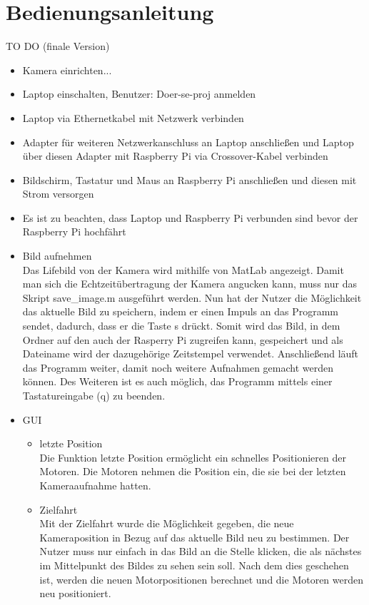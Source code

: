 \documentclass[12pt,a4paper,bibliography=totocnumbered,listof=totocnumbered]{scrartcl}
\begin{document}
\section{Bedienungsanleitung}
TO DO (finale Version)
\renewcommand{\labelitemi}{$\bullet$}
\renewcommand{\labelitemii}{$\bullet$}
\begin{itemize} 
\item Kamera einrichten...
\item Laptop einschalten, Benutzer: Doer-se-proj anmelden
\item Laptop via Ethernetkabel mit Netzwerk verbinden
\item Adapter für weiteren Netzwerkanschluss an Laptop anschließen und Laptop über diesen Adapter mit Raspberry Pi via Crossover-Kabel verbinden
\item Bildschirm, Tastatur und Maus an Raspberry Pi anschließen und diesen mit Strom versorgen
\item Es ist zu beachten, dass Laptop und Raspberry Pi verbunden sind bevor der Raspberry Pi hochfährt
\item Bild aufnehmen\\
Das Lifebild von der Kamera wird mithilfe von MatLab angezeigt. Damit man sich die Echtzeitübertragung der Kamera angucken kann, muss nur das Skript \glqq save\_image.m\grqq{} ausgeführt werden. Nun hat der Nutzer die Möglichkeit das aktuelle Bild zu speichern, indem er einen Impuls an das Programm sendet, dadurch, dass er  die Taste \glqq s\grqq{} drückt. Somit wird das Bild, in dem Ordner auf den auch der Rasperry Pi zugreifen kann, gespeichert und als Dateiname wird der dazugehörige Zeitstempel verwendet. Anschließend läuft das Programm weiter, damit noch weitere Aufnahmen gemacht werden können. Des Weiteren ist es auch möglich, das Programm mittels einer Tastatureingabe (\glqq q\grqq{}) zu beenden.
\item GUI 
\begin{itemize}
\item letzte Position\\
Die Funktion \glqq letzte Position\grqq{} ermöglicht ein schnelles Positionieren der Motoren. Die Motoren nehmen die Position ein, die sie bei der letzten Kameraaufnahme hatten.
\item Zielfahrt\\
Mit der \glqq Zielfahrt\grqq{} wurde die Möglichkeit gegeben, die neue Kameraposition in Bezug auf  das aktuelle Bild neu zu bestimmen. Der Nutzer muss nur einfach in das Bild an die Stelle klicken, die als nächstes im Mittelpunkt des Bildes zu sehen sein soll. Nach dem dies geschehen ist, werden die neuen Motorpositionen berechnet und die Motoren werden neu positioniert.

\end{itemize}
\end{itemize}
\end{document}
